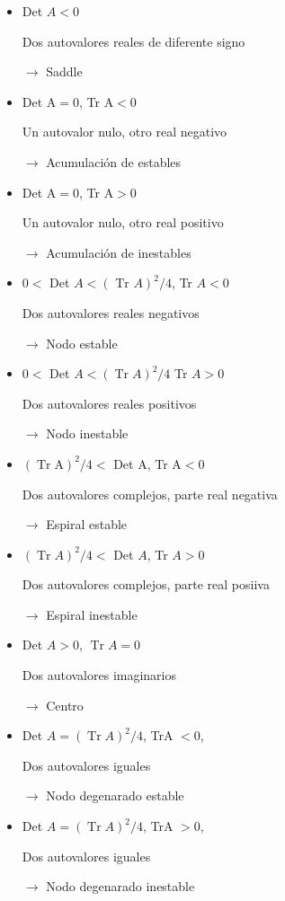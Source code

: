 \documentclass[%
 reprint,
 amsmath,amssymb,
 aps,
]{revtex4-1}
\begin{document}
\begin{itemize}
  \item Det $A<0$ 
  
  Dos autovalores reales de diferente signo 
  
  $\rightarrow$ Saddle
  \item Det $\mathrm{A}=0$, Tr $\mathrm{A}<0$ 
  
  Un autovalor nulo, otro real negativo 
  
  $\rightarrow$ Acumulación de estables
  \item Det $\mathrm{A}=0$, Tr $\mathrm{A}>0$ 
  
  Un autovalor nulo, otro real positivo 
  
  $\rightarrow$ Acumulación de inestables
  \item $0<$ Det $A<(\text { Tr } A)^{2} / 4$, Tr $A<0$ 
  
  Dos autovalores reales negativos 
  
  $\rightarrow$ Nodo estable
  \item $0<$ Det $A<(\operatorname{Tr} A)^{2} / 4$ Tr $A>0$ 
  
  Dos autovalores reales positivos 
  
  $\rightarrow$ Nodo inestable
  \item $(\operatorname{Tr} \mathrm{A})^{2} / 4<$ Det $\mathrm{A}$, Tr $\mathrm{A}<0$ 
  
  Dos autovalores complejos, parte real negativa 
  
  $\rightarrow$ Espiral estable
  \item $(\operatorname{Tr} A)^{2} / 4<$ Det $A$, Tr $A>0$ 
  
  Dos autovalores complejos, parte real posiiva 
  
  $\rightarrow$ Espiral inestable
  \item Det $A>0$, $\operatorname{Tr} A=0$ 
  
  Dos autovalores imaginarios 
  
  $\rightarrow$ Centro
  \item Det $A=(\operatorname{Tr} A)^{2} / 4$, TrA $<0$, 
  
  Dos autovalores iguales 
  
  $\rightarrow$ Nodo degenarado estable
  \item Det $A=(\operatorname{Tr} A)^{2} / 4$, TrA $>0$, 
  
  Dos autovalores iguales 
  
  $\rightarrow$ Nodo degenarado inestable
\end{itemize}
\end{document}
